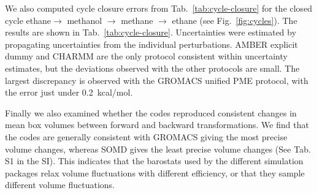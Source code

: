 \documentclass[journal=jctcce,manuscript=article]{achemso}
\begin{document}
We also computed cycle closure errors from Tab.~\ref{tab:cycle-closure} for
the closed cycle ethane$ \rightarrow$ methanol $\rightarrow$ methane $\rightarrow$ ethane (see Fig.~\ref{fig:cycles}). The results are shown in Tab.~\ref{tab:cycle-closure}. Uncertainties were estimated by propagating uncertainties from the individual perturbations. AMBER explicit dummy and CHARMM are the only protocol consistent within uncertainty estimates, but the deviations observed with the other protocols are small. The largest discrepancy is observed with the GROMACS unified PME protocol, with the error just under \SI{0.2}{kcal/mol}.

\begin{table}[]
  \begin{minipage}{\linewidth}
    \caption{Cycle closure errors (in \si{kcal.mol^{-1}}) for  ethane$ \rightarrow$ methanol $\rightarrow$ methane
$\rightarrow$ ethane}\label{tab:cycle-closure}
  \end{minipage}
\end{table}

Finally we also examined whether the codes reproduced consistent changes in mean box volumes between forward and backward transformations. We find that the codes are generally consistent with GROMACS giving the most precise volume changes, whereas SOMD gives the least precise volume changes (See Tab. S1 in the SI). This indicates that the barostats used by the different simulation packages relax volume fluctuations with different efficiency, or that they sample different volume fluctuations.
\end{document}

